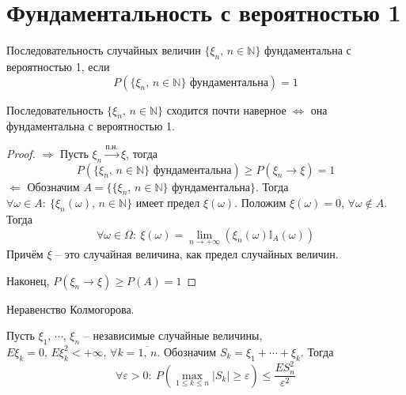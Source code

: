 \section{Фундаментальность с вероятностью 1}
\begin{definition}
	Последовательность случайных величин $\{\xi_n,\, n \in \mathbb{N}\}$ фундаментальна с вероятностью 1, если
	\[P(\{\xi_n,\, n \in \mathbb{N}\} \text{ фундаментальна}) = 1\]
\end{definition}

\begin{proposition}
	Последовательность $\{\xi_n,\, n \in \mathbb{N}\}$ сходится почти наверное $\Leftrightarrow$ она фундаментальна с вероятностью 1.
\end{proposition}

\begin{proof}
	$\Rightarrow$ Пусть $\xi_n \stackrel{\text{п.н.}}{\to} \xi$, тогда
	\[P(\{\xi_n,\, n \in \mathbb{N}\} \text{ фундаментальна}) \geq P(\xi_n \to \xi) = 1\]
	$\Leftarrow$ Обозначим $A = \{\{\xi_n,\, n \in \mathbb{N}\} \text{ фундаментальна}\}$. Тогда $\forall \omega \in A:\: \{\xi_n(\omega),\, n \in \mathbb{N}\}$ имеет предел $\xi(\omega)$. Положим $\xi(\omega) = 0,\, \forall \omega \not\in A$. Тогда
	\[\forall \omega \in \Omega:\: \xi(\omega) = \lim_{n \to +\infty}(\xi_n(\omega)\mathbb{I}_A(\omega))\]
	Причём $\xi$ -- это случайная величина, как предел случайных величин.

	Наконец, $P(\xi_n \to \xi) \geq P(A) = 1$
\end{proof}

\begin{theorem}
	Неравенство Колмогорова. 

	Пусть $\xi_1,\,\cdots,\,\xi_n$ -- независимые случайные величины, $E\xi_k = 0,\, E\xi_k^2 < +\infty,\, \forall k = \overline{1,\,n}$. Обозначим $S_k = \xi_1 + \cdots + \xi_k$. Тогда
	\[\forall \varepsilon > 0:\: P\left(\max_{1 \leq k \leq n} |S_k| \geq \varepsilon\right) \leq \frac{ES_n^2}{\varepsilon^2}\]
\end{theorem}

